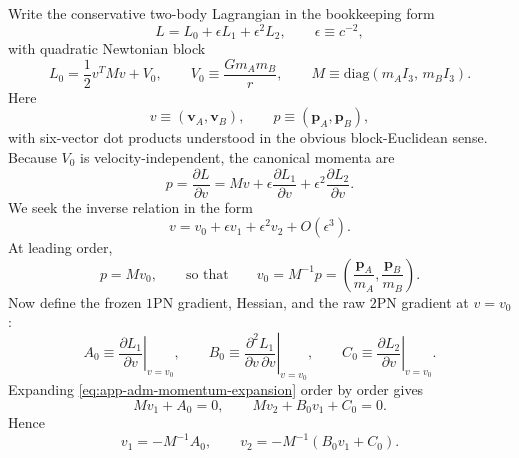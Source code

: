 \documentclass[11pt]{article}
\newcommand{\pvec}{\mathbf p}
\newcommand{\vct}{\mathbf v}
\newcommand{\OnePN}{\mathrm{1PN}}
\newcommand{\TwoPN}{\mathrm{2PN}}
\begin{document}
Write the conservative two-body Lagrangian in the bookkeeping form
\begin{equation}
L=L_0+\epsilon L_1+\epsilon^2 L_2,
\qquad
\epsilon\equiv c^{-2},
\label{eq:app-adm-epsilon-expansion}
\end{equation}
with quadratic Newtonian block
\begin{equation}
L_0=\frac12 v^T M v+V_0,
\qquad
V_0\equiv \frac{Gm_A m_B}{r},
\qquad
M\equiv \mathrm{diag}(m_A I_3,\,m_B I_3).
\label{eq:app-adm-L0-matrix}
\end{equation}
Here
\begin{equation}
v\equiv (\vct_A,\vct_B),
\qquad
p\equiv (\pvec_A,\pvec_B),
\label{eq:app-adm-vp-def}
\end{equation}
with six-vector dot products understood in the obvious block-Euclidean sense.
Because \(V_0\) is velocity-independent, the canonical momenta are
\begin{equation}
p=\frac{\partial L}{\partial v}
=Mv+\epsilon\frac{\partial L_1}{\partial v}
+\epsilon^2\frac{\partial L_2}{\partial v}.
\label{eq:app-adm-momentum-expansion}
\end{equation}
We seek the inverse relation in the form
\begin{equation}
v=v_0+\epsilon v_1+\epsilon^2 v_2+O(\epsilon^3).
\label{eq:app-adm-v-series}
\end{equation}
At leading order,
\begin{equation}
p=Mv_0,
\qquad\text{so that}\qquad
v_0=M^{-1}p=
\left(\frac{\pvec_A}{m_A},\frac{\pvec_B}{m_B}\right).
\label{eq:app-adm-v0}
\end{equation}
Now define the frozen \(\OnePN\) gradient, Hessian, and the raw \(\TwoPN\) gradient at
\(v=v_0\):
\begin{equation}
A_0\equiv \left.\frac{\partial L_1}{\partial v}\right|_{v=v_0},
\qquad
B_0\equiv \left.\frac{\partial^2 L_1}{\partial v\,\partial v}\right|_{v=v_0},
\qquad
C_0\equiv \left.\frac{\partial L_2}{\partial v}\right|_{v=v_0}.
\label{eq:app-adm-A0B0C0}
\end{equation}
Expanding \cref{eq:app-adm-momentum-expansion} order by order gives
\begin{equation}
Mv_1+A_0=0,
\qquad
Mv_2+B_0v_1+C_0=0.
\label{eq:app-adm-v1v2-eqs}
\end{equation}
Hence
\begin{equation}
v_1=-M^{-1}A_0,
\qquad
v_2=-M^{-1}(B_0v_1+C_0).
\label{eq:app-adm-v1v2}
\end{equation}
\end{document}
